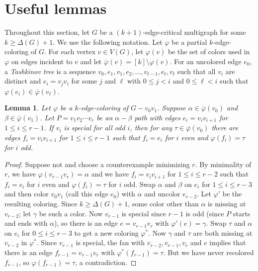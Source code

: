 \documentclass[12pt]{amsart}
\theoremstyle{plain}
\newtheorem{lem}[thm]{Lemma}
\theoremstyle{definition}
\theoremstyle{remark}
\newcommand{\vph}{\varphi}
\newcommand{\vphn}{\overline{\varphi}}
\begin{document}

\section{Useful lemmas}

Throughout this section, let $G$ be a $(k+1)$-edge-critical multigraph for some
$k \ge \Delta(G) + 1$.  We use the following notation.  Let $\varphi$ be a partial
$k$-edge-coloring of $G$.  For each vertex $v\in V(G)$, let $\varphi(v)$ be the
set of colors used in $\vph$ on edges incident to $v$ and let
$\vphn(v)=[k]\setminus \vph(v)$. For an uncolored edge $e_0$, a \emph{Tashkinov
tree} is a sequence $v_0, e_1, v_1, e_2,\ldots, v_{t-1},e_t,v_t$ such that all
$v_i$ are distinct and $e_i=v_jv_i$ for some $j$ and $\ell$ with $0\le j< i$
and $0\le \ell < i$ such that $\vph(e_i)\in \vphn(v_\ell)$.

\setcounter{thm}{-1}
\begin{lem}\label{SpecialPath}
Let $\vph$ be a $k$-edge-coloring of $G-v_0v_1$.  Suppose $\alpha \in \vphn(v_0)$ and $\beta \in \vphn(v_1)$.  
Let $P = v_1v_2\cdots v_r$ be an $\alpha-\beta$ path
with edges $e_i = v_iv_{i+1}$ for $1 \le i \le r-1$.  If $v_i$ is special for
all odd $i$, then for any $\tau \in \vphn(v_0)$ there are edges $f_i =
v_iv_{i+1}$ for $1 \le i \le r-1$ such that $f_i = e_i$ for $i$ even and
$\vph(f_i) = \tau$ for $i$ odd.
\end{lem}
\begin{proof}
Suppose not and choose a counterexample minimizing $r$.  By minimality of
$r$, we have $\vph(v_{r-1}v_r) = \alpha$ and we have $f_i = v_iv_{i+1}$ for
$1 \le i \le r-2$ such that $f_i = e_i$ for $i$ even and $\vph(f_i) = \tau$ for
$i$ odd.  Swap $\alpha$ and $\beta$ on $e_i$ for $1 \le i \le r-3$ and then
color $v_0v_1$ (call this edge $e_0$) with $\alpha$ and uncolor $e_{r-2}$.  Let
$\vph'$ be the resulting coloring.  Since $k \ge \Delta(G) + 1$, some color
other than $\alpha$ is missing at $v_{r-2}$; let $\gamma$ be such a color.  Now 
$v_{r-1}$ is special since $r-1$ is odd (since $P$ starts and ends with
$\alpha$), so there is an edge $e = v_{r-1}v_r$ with $\vph'(e) = \gamma$.  
Swap $\tau$ and $\alpha$ on $e_i$ for $0 \le i \le r-3$ to get a new coloring
$\vph^*$.  Now $\gamma$ and $\tau$ are both missing at $v_{r-2}$ in $\vph^*$.
Since $v_{r-1}$ is special, the fan with $v_{r-2}, v_{r-1}, v_r$ and $e$
implies that there is an edge $f_{r-1} = v_{r-1}v_r$ with $\vph^*(f_{r-1}) =
\tau$.  
But we have never recolored $f_{r-1}$, so $\vph(f_{r-1})=\tau$, a
contradiction.
\end{proof}
\end{document}
